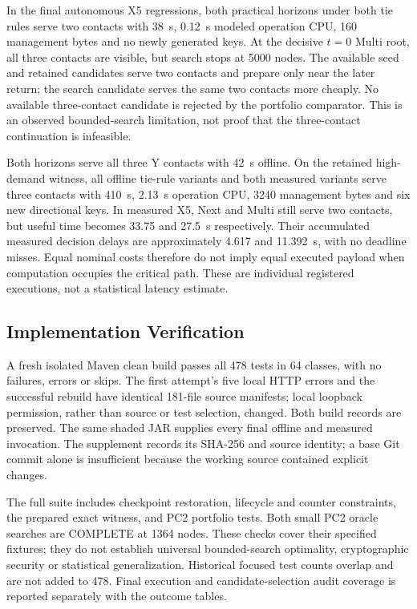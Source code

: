\documentclass[conference]{IEEEtran}
\begin{document}
In the final autonomous X5 regressions, both practical horizons under both tie rules serve two contacts with 38~s, 0.12~s modeled operation CPU, 160 management bytes and no newly generated keys. At the decisive $t=0$ Multi root, all three contacts are visible, but search stops at 5000 nodes. The available seed and retained candidates serve two contacts and prepare only near the later return; the search candidate serves the same two contacts more cheaply. No available three-contact candidate is rejected by the portfolio comparator. This is an observed bounded-search limitation, not proof that the three-contact continuation is infeasible.

Both horizons serve all three Y contacts with 42~s offline. On the retained high-demand witness, all offline tie-rule variants and both measured variants serve three contacts with 410~s, 2.13~s operation CPU, 3240 management bytes and six new directional keys. In measured X5, Next and Multi still serve two contacts, but useful time becomes 33.75 and 27.5~s respectively. Their accumulated measured decision delays are approximately 4.617 and 11.392~s, with no deadline misses. Equal nominal costs therefore do not imply equal executed payload when computation occupies the critical path. These are individual registered executions, not a statistical latency estimate.

\subsection{Implementation Verification}
A fresh isolated Maven clean build passes all 478 tests in 64 classes, with no failures, errors or skips. The first attempt's five local HTTP errors and the successful rebuild have identical 181-file source manifests; local loopback permission, rather than source or test selection, changed. Both build records are preserved. The same shaded JAR supplies every final offline and measured invocation. The supplement records its SHA-256 and source identity; a base Git commit alone is insufficient because the working source contained explicit changes.

The full suite includes checkpoint restoration, lifecycle and counter constraints, the prepared exact witness, and PC2 portfolio tests. Both small PC2 oracle searches are COMPLETE at 1364 nodes. These checks cover their specified fixtures; they do not establish universal bounded-search optimality, cryptographic security or statistical generalization. Historical focused test counts overlap and are not added to 478. Final execution and candidate-selection audit coverage is reported separately with the outcome tables.
\end{document}
